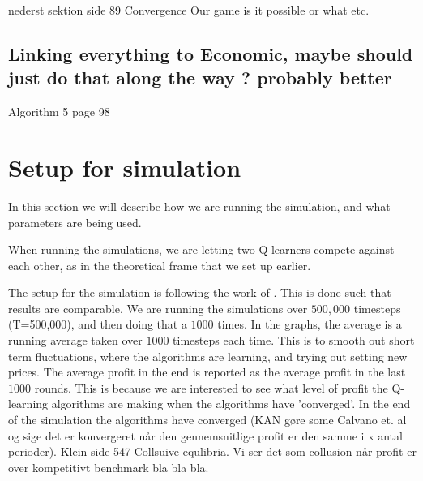 \documentclass{article}
\begin{document}
nederst sektion side 89
Convergence Our game  is it possible or what etc. 

\subsection{Linking everything to Economic, maybe should just do that along the way ? probably better}
Algorithm 5 page 98





\section{Setup for simulation}

In this section we will describe how we are running the simulation, and what parameters are being used. 

When running the simulations, we are letting two Q-learners compete against each other, as in the theoretical frame that we set up earlier.

The setup for the simulation is following the work of \cite{Klein2021}. This is done such that results are comparable.
We are running the simulations over $500,000$ timesteps (T=500,000), and then doing that a $1000$ times. In the graphs, the average is a running average taken over $1000$ timesteps each time. This is to smooth out short term fluctuations, where the algorithms are learning, and trying out setting new prices. The average profit in the end is reported as the average profit in the last $1000$ rounds. This is because we are interested to see what level of profit the Q-learning algorithms are making when the algorithms have 'converged'. In the end of the simulation the algorithms have converged (KAN gøre some Calvano et. al og sige det er konvergeret når den gennemsnitlige profit er den samme i x antal perioder).
Klein side 547 Collsuive equlibria. Vi ser det som collusion når profit er over kompetitivt benchmark bla bla bla.
\end{document}
